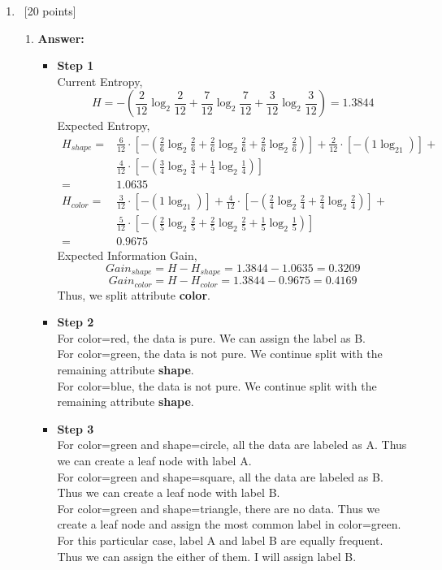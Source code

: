 \documentclass[12pt, fullpage,letterpaper]{article}
\begin{document}
\begin{enumerate}
\begin{enumerate}
\end{enumerate}
\item~[20 points]
\begin{enumerate}
\item \textbf{Answer:}
\begin{itemize}
\item \textbf{Step 1}\\
Current Entropy,
$$H=-(\frac{2}{12}\log_2\frac{2}{12}+\frac{7}{12}\log_2\frac{7}{12}+\frac{3}{12}\log_2\frac{3}{12})=1.3844$$
Expected Entropy,
\begin{align*}
H_{shape}=&\frac{6}{12} \cdot [-(\frac{2}{6}\log_2\frac{2}{6}+\frac{2}{6}\log_2\frac{2}{6}+\frac{2}{6}\log_2\frac{2}{6})]+\frac{2}{12} \cdot [-(1\log_21)]+\\
&\frac{4}{12} \cdot [-(\frac{3}{4}\log_2\frac{3}{4}+\frac{1}{4}\log_2\frac{1}{4})]\\
=&1.0635\\
H_{color}=&\frac{3}{12} \cdot [-(1\log_21)]+\frac{4}{12} \cdot [-(\frac{2}{4}\log_2\frac{2}{4}+\frac{2}{4}\log_2\frac{2}{4})]+\\
&\frac{5}{12} \cdot [-(\frac{2}{5}\log_2\frac{2}{5}+\frac{2}{5}\log_2\frac{2}{5}+\frac{1}{5}\log_2\frac{1}{5})]\\
=&0.9675
\end{align*}
Expected Information Gain,
$$Gain_{shape}=H-H_{shape}=1.3844-1.0635=0.3209$$
$$Gain_{color}=H-H_{color}=1.3844-0.9675=0.4169$$
Thus, we split attribute \textbf{color}.
\item \textbf{Step 2}\\
For color=red, the data is pure. We can assign the label as B.\\
For color=green, the data is not pure. We continue split with the remaining attribute \textbf{shape}.\\
For color=blue, the data is not pure. We continue split with the remaining attribute \textbf{shape}.
\item \textbf{Step 3}\\
For color=green and shape=circle, all the data are labeled as A. Thus we can create a leaf node with label A.\\
For color=green and shape=square, all the data are labeled as B. Thus we can create a leaf node with label B.\\
For color=green and shape=triangle, there are no data. Thus we create a leaf node and assign the most common label in color=green. For this particular case, label A and label B are equally frequent. Thus we can assign the either of them. I will assign label B.\\

\end{itemize}
\end{enumerate}
\end{enumerate}
\end{document}
